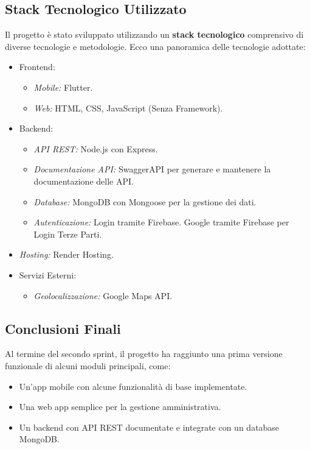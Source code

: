 \subsection{Stack Tecnologico Utilizzato}
Il progetto è stato sviluppato utilizzando un \textbf{stack tecnologico} comprensivo di diverse tecnologie e metodologie. Ecco una panoramica delle tecnologie adottate:
\begin{itemize}
    \item Frontend:
    \begin{itemize}
        \item \textit{Mobile:} Flutter.
        \item \textit{Web:} HTML, CSS, JavaScript (Senza Framework).
    \end{itemize}
  \item Backend:
  \begin{itemize}
      \item \textit{API REST:} Node.js con Express.
      \item \textit{Documentazione API:} SwaggerAPI per generare e mantenere la documentazione delle API.
      \item \textit{Database:} MongoDB con Mongoose per la gestione dei dati.
      \item \textit{Autenticazione:} Login tramite Firebase. Google tramite Firebase per Login Terze Parti.
  \end{itemize}
  \item \textit{Hosting:} Render Hosting.
  \item Servizi Esterni:
  \begin{itemize}
      \item \textit{Geolocalizzazione:} Google Maps API.
  \end{itemize}
\end{itemize}

\subsection{Conclusioni Finali}
Al termine del secondo sprint, il progetto ha raggiunto una prima versione funzionale di alcuni moduli principali, come:
\begin{itemize}
    \item Un'app mobile con alcune funzionalità di base implementate.
    \item Una web app semplice per la gestione amministrativa.
    \item Un backend con API REST documentate e integrate con un database MongoDB.
\end{itemize}

